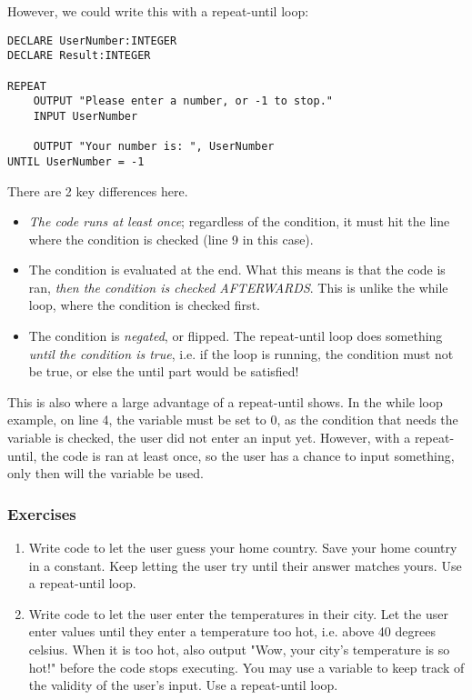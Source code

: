 \documentclass[./main.tex]{subfiles}
\begin{document}
However, we could write this with a repeat-until loop:

\begin{verbatim}
DECLARE UserNumber:INTEGER
DECLARE Result:INTEGER

REPEAT 
    OUTPUT "Please enter a number, or -1 to stop."
    INPUT UserNumber

    OUTPUT "Your number is: ", UserNumber
UNTIL UserNumber = -1
\end{verbatim}

There are 2 key differences here.

\begin{itemize}
    \item \emph{The code runs at least once}; regardless of the condition, it must hit the line where the condition is checked (line 9 in this case).
    \item The condition is evaluated at the end. What this means is that the code is ran, \emph{then the condition is checked AFTERWARDS}. This is unlike the while loop, where the condition is checked first.
    \item The condition is \emph{negated}, or flipped. The repeat-until loop does something \emph{until the condition is true}, i.e. if the loop is running, the condition must not be true, or else the until part would be satisfied!
\end{itemize}

This is also where a large advantage of a repeat-until shows. In the while loop example, on line 4, the variable must be set to 0, as the condition that needs the variable is checked, the user did not enter an input yet. However, with a repeat-until, the code is ran at least once, so the user has a chance to input something, only then will the variable be used.

\subsubsection{Exercises}

\begin{enumerate}
    \item Write code to let the user guess your home country. Save your home country in a constant. Keep letting the user try until their answer matches yours. Use a repeat-until loop.
        \largelines
        \newpage
    \item Write code to let the user enter the temperatures in their city. Let the user enter values until they enter a temperature too hot, i.e. above 40 degrees celsius. When it is too hot, also output "Wow, your city's temperature is so hot!" before the code stops executing. You may use a variable to keep track of the validity of the user's input. Use a repeat-until loop.
        \largelines
\end{enumerate}
\end{document}
